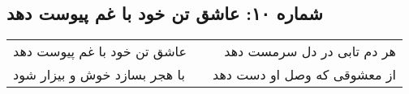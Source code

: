 \begin{center}
\section*{شماره ۱۰: عاشق تن خود با غم پیوست دهد}
\label{sec:010}
\begin{longtable}{l p{0.5cm} r}
عاشق تن خود با غم پیوست دهد
&&
هر دم تابی در دل سرمست دهد
\\
با هجر بسازد خوش و بیزار شود
&&
از معشوقی که وصل او دست دهد
\\
\end{longtable}
\end{center}
